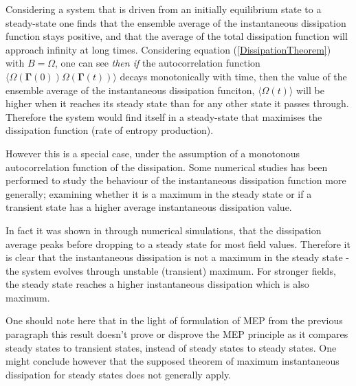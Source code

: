 \documentclass[a4paper,12pt]{article}
\begin{document}
Considering a system that is driven from an initially equilibrium state to a steady-state one finds that the ensemble average of the instantaneous dissipation function stays positive, and that the average of the total dissipation function will approach infinity at long times. Considering equation (\ref{DissipationTheorem}) with $B=\Omega$, one can see \textit{then if} the autocorrelation function $\langle \Omega(\bm{\Gamma}(0))\Omega(\bm{\Gamma}(t))\rangle$ decays monotonically with time, then the value of the ensemble average of the instantaneous dissipation funciton, $\langle \Omega(t) \rangle$ will be higher when it reaches its steady state than for any other state it passes through. Therefore the system would find itself in a steady-state that maximises the dissipation function (rate of entropy production).

However this is a special case, under the assumption of a monotonous autocorrelation function of the dissipation. Some numerical studies has been performed to study the behaviour of the instantaneous dissipation function more generally; examining whether it is a maximum in the steady state or if a transient state has a higher average instantaneous dissipation value.

In fact it was shown in \cite{Brookes:2011hu} through numerical simulations, that the dissipation average peaks before dropping to a steady state for most field values. Therefore it is clear that the instantaneous dissipation is not a maximum in the steady state - the system evolves through unstable (transient) maximum. For stronger fields, the steady state reaches a higher instantaneous dissipation which is also maximum.

One should note here that in the light of formulation of MEP from the previous paragraph this result doesn't prove or disprove the MEP principle as it compares steady states to transient states, instead of steady states to steady states. One might conclude however that the supposed theorem of maximum instantaneous dissipation for steady states does not generally apply.
\end{document}
